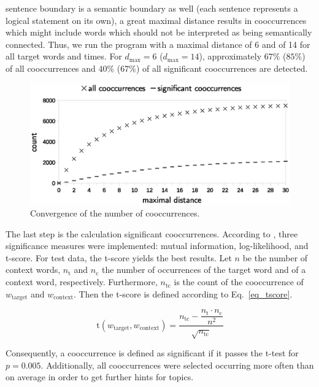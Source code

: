 \documentclass[10pt,a4paper,twocolumn]{scrartcl}
\begin{document}
sentence boundary is a semantic boundary as well (each sentence represents a logical statement on its own), a great maximal distance results in cooccurrences which might include words which should not be interpreted as being semantically connected. Thus, we run the program with a maximal distance of 6 and of 14 for all target words and times. For  $d_\text{max} = 6$ ($d_\text{max} = 14$), approximately $67\%$ ($85\%$) of all cooccurrences and $40\%$ ($67\%$) of all significant cooccurrences are detected. 


\begin{figure}
\includegraphics[width=\columnwidth]{figures/distance_eps}
\caption{Convergence of the number of cooccurrences.} \label{fig:distance}
\end{figure}

The last step is the calculation significant cooccurrences. According to \citep{Bordag2008, Manning+Schuetze:2003}, three significance measures were implemented: mutual information, log-likelihood, and t-score. For test data, the t-score yields the best results. Let $n$ be the number of context words, $n_\text{t}$ and $n_\text{c}$ the number of occurrences of the target word and of a context word, respectively. Furthermore, $n_{\text{t}\text{c}}$ is the count of the cooccurrence of $w_\text{target}$ and $w_\text{context}$. Then the t-score is defined according to Eq.~\ref{eq_tscore}.

\begin{equation}
\text{t}(w_\text{target}, w_\text{context}) = \frac{n_{\text{t}\text{c}} - \dfrac{n_\text{t} \cdot n_\text{c}}{n^2}}{\sqrt{n_{\text{t}\text{c}}}} \label{eq_tscore}
\end{equation}

 Consequently, a cooccurrence is defined as significant if it passes the t-test for $p = 0.005$. Additionally, all cooccurrences were selected occurring more often than on average in order to get further hints for topics. 
\end{document}
